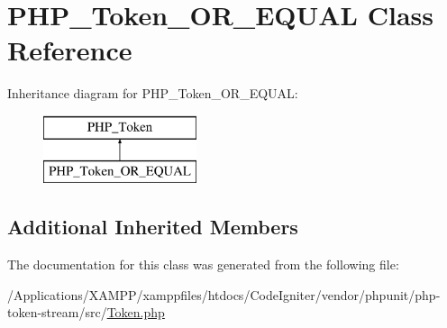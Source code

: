 \hypertarget{class_p_h_p___token___o_r___e_q_u_a_l}{}\section{P\+H\+P\+\_\+\+Token\+\_\+\+O\+R\+\_\+\+E\+Q\+U\+AL Class Reference}
\label{class_p_h_p___token___o_r___e_q_u_a_l}
Inheritance diagram for P\+H\+P\+\_\+\+Token\+\_\+\+O\+R\+\_\+\+E\+Q\+U\+AL\+:\begin{figure}[H]
\begin{center}
\leavevmode
\includegraphics[height=2.000000cm]{class_p_h_p___token___o_r___e_q_u_a_l}
\end{center}
\end{figure}
\subsection*{Additional Inherited Members}


The documentation for this class was generated from the following file\+:\begin{DoxyCompactItemize}
\item 
/\+Applications/\+X\+A\+M\+P\+P/xamppfiles/htdocs/\+Code\+Igniter/vendor/phpunit/php-\/token-\/stream/src/\mbox{\hyperlink{_token_8php}{Token.\+php}}\end{DoxyCompactItemize}
